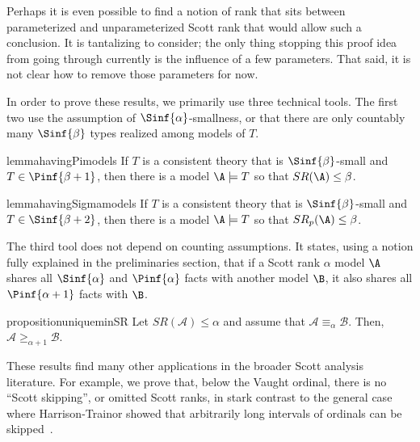 \documentclass[10pt,a4paper]{amsart}
\renewcommand{\-}{\text{-}}
\begin{document}
Perhaps it is even possible to find a notion of rank that sits between parameterized and unparameterized Scott rank that would allow such a conclusion.
It is tantalizing to consider; the only thing stopping this proof idea from going through currently is the influence of a few parameters.
That said, it is not clear how to remove those parameters for now.

In order to prove these results, we primarily use three technical tools.
The first two use the assumption of $\Sinf{\alpha}$-smallness, or that there are only countably many $\Sinf{\beta}$ types realized among models of $T$.
\begin{restatable*}{lemma}{havingPimodels}\label{lem:havingPimodels}
  If $T$ is a consistent theory that is $\Sinf{\beta}$-small and $T\in \Pinf{\beta+1}$, then there is a model $\A\models T$ so that $SR(\A)\leq \beta$. 
\end{restatable*}
\begin{restatable*}{lemma}{havingSigmamodels}\label{lem:havingSigmamodels}
  If $T$ is a consistent theory that is $\Sinf{\beta}$-small and $T\in \Sinf{\beta+2}$, then there is a model $\A\models T$ so that $SR_p(\A)\leq \beta$. 
\end{restatable*}
The third tool does not depend on counting assumptions.
It states, using a notion fully explained in the preliminaries section, that if a Scott rank $\alpha$ model $\A$ shares all $\Sinf{\alpha}$ and $\Pinf{\alpha}$ facts with another model $\B$, it also shares all  $\Pinf{\alpha+1}$ facts with $\B$.
\begin{restatable*}{proposition}{uniqueminSR}\label{prop:uniqueminSR}
    Let $SR(\mathcal{A})\leq\alpha$ and assume that $\mathcal{A}\equiv_{\alpha}\mathcal{B}$. Then, $\mathcal{A}\geq_{\alpha+1}\mathcal{B}$.
\end{restatable*}

These results find many other applications in the broader Scott analysis literature.
For example, we prove that, below the Vaught ordinal, there is no ``Scott skipping'', or omitted Scott ranks, in stark contrast to the general case where Harrison-Trainor showed that arbitrarily long intervals of ordinals can be skipped~\cite{HT18}.
\end{document}
